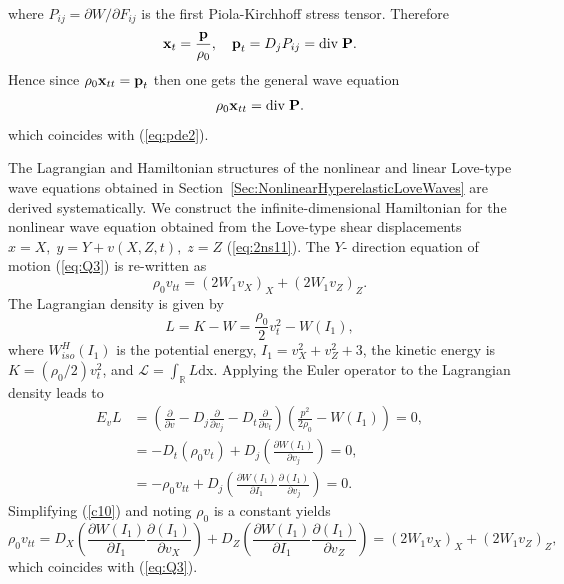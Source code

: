 \documentclass[11pt,letter,subeqn,fleqn]{article}
\numberwithin{equation}{section}
\numberwithin{table}{section}
\numberwithin{figure}{section}
\def\vec#1{{\boldsymbol{\rm #1}}} %
\def\vec#1{{\boldsymbol{\rm #1}}} %
\begin{document}
where $\displaystyle P_{ij}={\partial W}/{\partial {F_{ij}}}$	is the first Piola-Kirchhoff stress tensor. Therefore
\begin{equation}\label{c6}
\displaystyle 	\vec{x}_{t}=\frac{\vec{p}}{\rho_{0}},\quad \displaystyle \vec{p}_{t}=D_{j}P_{ij}=\mathrm{div}\;\vec{P}.
\end{equation}
Hence since $\rho_{0}\vec{x}_{tt}=\vec{p}_{t}$ then one gets the general wave equation
\begin{equation}\label{c7}
\rho_{0}\vec{x}_{tt}=\mathrm{div}\;\vec{P}.
\end{equation}
which coincides with (\ref{eq:pde2}).

The Lagrangian and Hamiltonian structures of the nonlinear and linear Love-type wave equations obtained in Section~\ref{Sec:NonlinearHyperelasticLoveWaves} are derived systematically.
 We construct the infinite-dimensional Hamiltonian for the nonlinear wave equation obtained from the Love-type shear displacements
	$\displaystyle x={X},\; y=Y+v(X,Z,t),\;z={Z}$ (\ref{eq:2ns11}). The $Y$- direction equation of motion (\ref{eq:Q3}) is re-written as
	\begin{equation*}
	\rho_{0}v_{tt}=\left(2W_{1}v_{X}\right)_{X}+\left(2W_{1}v_{Z}\right)_{Z}.
	\end{equation*}
	The Lagrangian density is given by
	\begin{equation}\label{c8}
	L=K-W=\frac{\rho_{0}}{2}v^{2}_{t}-W(I_{1}),
	\end{equation}
	where $W^{H}_{iso}(I_{1})$ is the potential energy, $I_{1}=v^{2}_{X}+v^{2}_{Z}+3$, the kinetic energy is $K=(\rho_{0}/2){v}^{2}_{t}$, and $\mathcal{L}=\int_{\mathbb{R}}L\mathrm{d}$x. Applying the Euler operator to the Lagrangian density leads to
	\begin{equation}\label{c10}
	\begin{split}
	E_{v}L&=\left(\frac{\partial}{\partial v}-D_{j}\frac{\partial}{\partial v_{j}}-D_{t}\frac{\partial}{\partial v_{t}}\right)\left(\frac{p^{2}}{2\rho_{0}}-W(I_{1})\right)=0,\\
	&=-D_{t}\left({\rho_{0}}v_{t}\right)+D_{j}\left(\frac{\partial W(I_{1})}{\partial v_{j}}\right)=0,\\
	&=-{\rho_{0}}v_{tt}+D_{j}\left(\frac{\partial W(I_{1})}{\partial I_{1}}\frac{\partial (I_{1})}{\partial v_{j}}\right)=0.
	\end{split}
	\end{equation}
	Simplifying (\ref{c10}) and noting $\rho_{0}$ is a constant yields
	\begin{equation}\label{c11}
	\rho_{0}v_{tt}=D_{X}\left(\frac{\partial W(I_{1})}{\partial I_{1}}\frac{\partial (I_{1})}{\partial v_{X}}\right)+D_{Z}\left(\frac{\partial W(I_{1})}{\partial I_{1}}\frac{\partial (I_{1})}{\partial v_{Z}}\right)=\left(2W_{1}v_{X}\right)_{X}+\left(2W_{1}v_{Z}\right)_{Z},
	\end{equation}
	which coincides with (\ref{eq:Q3}).
	
\end{document}
